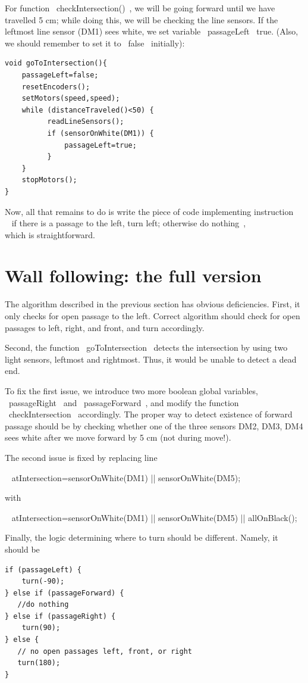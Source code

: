 \documentclass[oneside]{stml-l}
\numberwithin{figure}{chapter}
\begin{document}
For function ~checkIntersection()~, we will be going forward until 
we have travelled 5 cm;  while doing this, we will be checking the 
line sensors. If the leftmost line sensor (DM1)  sees white, we set 
variable ~passageLeft~ true. (Also, we should remember to set it 
to ~false~ initially):
\begin{lstlisting}
void goToIntersection(){
    passageLeft=false;
    resetEncoders();
    setMotors(speed,speed);
    while (distanceTraveled()<50) {
          readLineSensors();
          if (sensorOnWhite(DM1)) {
              passageLeft=true;
          }
    }
    stopMotors();
}
\end{lstlisting}

Now, all that remains to do is write the piece of code implementing 
instruction \\
~ if there is a passage to the left, turn left; otherwise do nothing~, \\
which is straightforward. 

\section{Wall following: the full version}
The algorithm described in the previous section has obvious deficiencies. 
First, it only checks  for open passage to the left. Correct algorithm 
should check for open passages to left, right, 
and front, and turn accordingly.

Second, the function ~goToIntersection~ detects the intersection by 
using two light sensors,  leftmost and rightmost. Thus, it would be 
unable to detect a dead end.

To fix the first issue, we introduce two more boolean global variables, 
~passageRight~ and  ~passageForward~, and modify the function ~checkIntersection~ 
accordingly. The proper  way to detect existence of forward passage should 
be by checking whether one of the three sensors DM2, DM3, DM4 sees white 
after we move forward by 5 cm (not during move!). 

The second issue is fixed by replacing line 

~ atIntersection=sensorOnWhite(DM1) || sensorOnWhite(DM5); ~

with 

~ atIntersection=sensorOnWhite(DM1) || sensorOnWhite(DM5) || allOnBlack(); ~

Finally, the logic determining where to turn should be different. Namely, it should be 
\begin{lstlisting}
if (passageLeft) {
    turn(-90);
} else if (passageForward) {
   //do nothing
} else if (passageRight) {
    turn(90);
} else {
   // no open passages left, front, or right
   turn(180);
}
\end{lstlisting}
\end{document}
